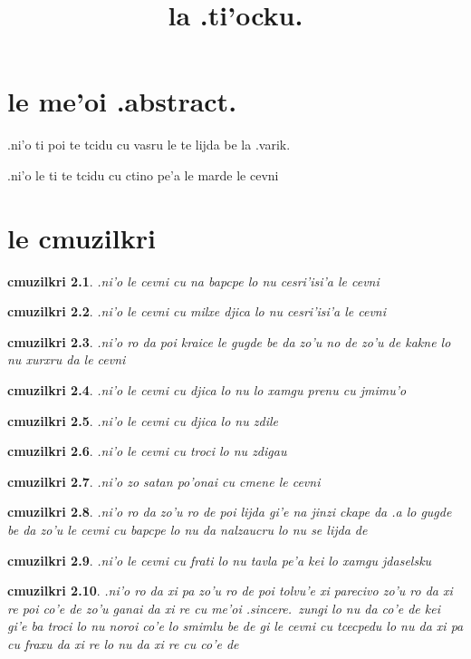 \documentclass{report}
\title{la .ti'ocku.}
\newtheorem{cmuzilkri}{cmuzilkri}
\begin{document}
\maketitle
\chapter{le me'oi .abstract.}
.ni'o ti poi te tcidu cu vasru le te lijda be la .varik.

.ni'o le ti te tcidu cu ctino pe'a le marde le cevni

\chapter{le cmuzilkri}
\begin{cmuzilkri}
	.ni'o le cevni cu na bapcpe lo nu cesri'isi'a le cevni
\end{cmuzilkri}
\begin{cmuzilkri}
	.ni'o le cevni cu milxe djica lo nu cesri'isi'a le cevni
\end{cmuzilkri}
\begin{cmuzilkri}
        .ni'o ro da poi kraice le gugde be da zo'u no de zo'u de kakne lo nu xurxru da le cevni
\end{cmuzilkri}
\begin{cmuzilkri}
	.ni'o le cevni cu djica lo nu lo xamgu prenu cu jmimu'o
\end{cmuzilkri}
\begin{cmuzilkri}
        .ni'o le cevni cu djica lo nu zdile
\end{cmuzilkri}
\begin{cmuzilkri}
        .ni'o le cevni cu troci lo nu zdigau
\end{cmuzilkri}
\begin{cmuzilkri}
        .ni'o zo satan po'onai cu cmene le cevni
\end{cmuzilkri}
\begin{cmuzilkri}
        .ni'o ro da zo'u ro de poi lijda gi'e na jinzi ckape da .a lo gugde be da zo'u le cevni cu bapcpe lo nu da nalzaucru lo nu se lijda de
\end{cmuzilkri}
\begin{cmuzilkri}
        .ni'o le cevni cu frati lo nu tavla pe'a kei lo xamgu jdaselsku
\end{cmuzilkri}
\begin{cmuzilkri}
        .ni'o ro da xi pa zo'u ro de poi tolvu'e xi parecivo zo'u ro da xi re poi co'e de zo'u ganai da xi re cu me'oi .sincere.\ zungi lo nu da co'e de kei gi'e ba troci lo nu noroi co'e lo smimlu be de gi le cevni cu tcecpedu lo nu da xi pa cu fraxu da xi re lo nu da xi re cu co'e de
\end{cmuzilkri}
\end{document}
